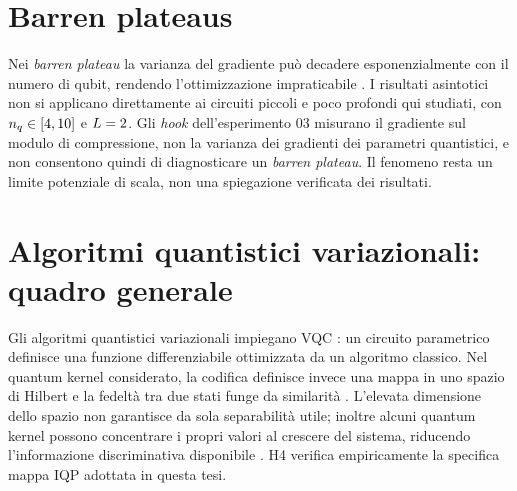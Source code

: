 \section{Barren plateaus}
\label{sec:barren-plateaus}

Nei \emph{barren plateau} la varianza del gradiente può decadere
esponenzialmente con il numero di qubit, rendendo l'ottimizzazione impraticabile
\parencite{mcclean2018barren}. I risultati asintotici non si applicano
direttamente ai circuiti piccoli e poco profondi qui studiati, con
$n_q\in[4,10]$ e $L=2$. Gli \emph{hook} dell'esperimento 03 misurano il
gradiente sul modulo di compressione, non la varianza dei gradienti dei parametri
quantistici, e non consentono quindi di diagnosticare un \emph{barren plateau}.
Il fenomeno resta un limite potenziale di scala, non una spiegazione verificata
dei risultati.

\section{Algoritmi quantistici variazionali: quadro generale}
\label{sec:vqa}

Gli algoritmi quantistici variazionali impiegano VQC
\parencite{cerezo2021variational}: un circuito parametrico definisce una
funzione differenziabile ottimizzata da un algoritmo classico. Nel quantum
kernel considerato, la codifica definisce invece una mappa in uno spazio di
Hilbert e la fedeltà tra due stati funge da similarità
\parencite{schuld2019quantum}.
L'elevata dimensione dello spazio non garantisce da sola separabilità utile;
inoltre alcuni quantum kernel possono concentrare i propri valori al crescere
del sistema, riducendo l'informazione discriminativa disponibile
\parencite{thanasilp2024concentration}. H4 verifica empiricamente la specifica
mappa IQP adottata in questa tesi.
